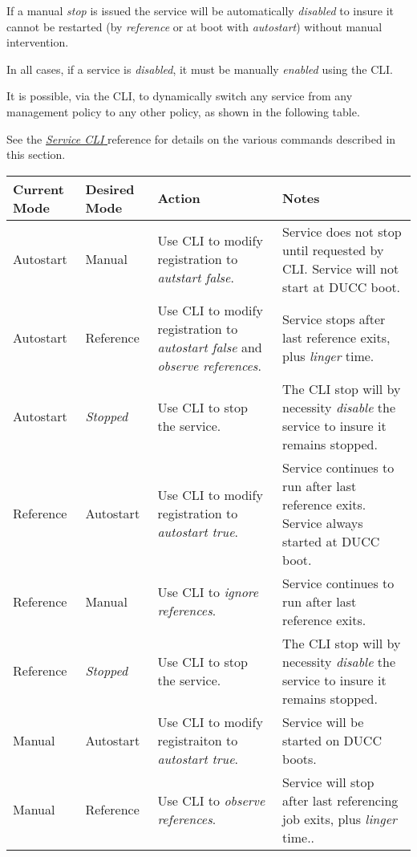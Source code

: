       If a manual {\em stop} is issued the service will be automatically {\em disabled} to insure it
      cannot be restarted (by {\em reference} or at boot with {\em autostart}) without manual
      intervention.

      In all cases, if a service is {\em disabled}, it must be manually {\em enabled} using the CLI.

      It is possible, via the CLI, to dynamically switch any service from any management policy
      to any other policy, as shown in the following table.

      See the \hyperref[sec:cli.ducc-services]{\em Service CLI } reference for details on the various 
      commands described in this section.

      \begin{tabular}{| l | l | p{6cm} | p{6cm} |}
        \hline
        Current Mode & Desired Mode & Action & Notes \\
        \hline
        \hline
        Autostart    & Manual       & Use CLI to modify registration to {\em autstart false}. & Service does not stop until requested by CLI. Service will not start at DUCC boot.\\
        \hline
        Autostart    & Reference    & Use CLI to modify registration to {\em autostart false} and {\em observe references}. & Service stops  after last reference exits, plus {\em linger} time.\\
        \hline
        Autostart    & {\em Stopped} & Use CLI to stop the service. & The CLI stop will by necessity {\em disable} the service to insure it remains stopped. \\
        \hline
        Reference    & Autostart    & Use CLI to modify registration to {\em autostart true}. & Service continues to run after last reference exits.  Service always started at DUCC boot. \\
        \hline
        Reference    & Manual       & Use CLI to {\em ignore references}. & Service continues to run after last reference exits. \\
        \hline
        Reference    & {\em Stopped} & Use CLI to stop the service. & The CLI stop will by necessity {\em disable} the service to insure it remains stopped. \\
        \hline
        Manual       & Autostart    & Use CLI to modify registraiton to {\em autostart true}. & Service will be started on DUCC boots. \\
        \hline
        Manual       & Reference    & Use CLI to {\em observe references}. & Service will stop after last referencing job exits, plus {\em linger} time.. \\

\end{tabular}
